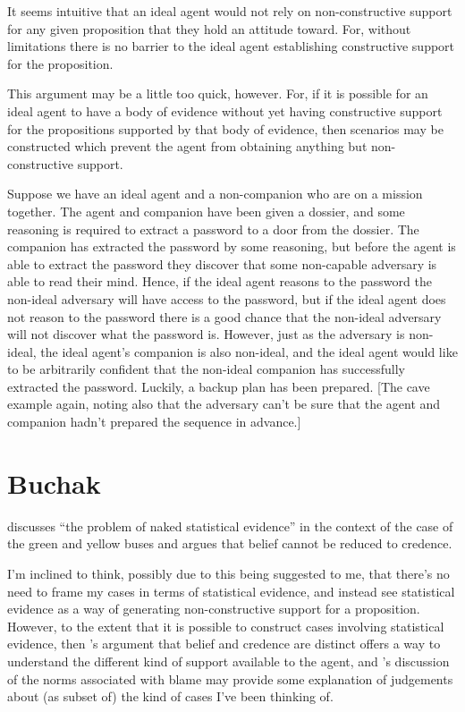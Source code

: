 \documentclass[10pt]{article}
\begin{document}
It seems intuitive that an ideal agent would not rely on non-constructive support for any given proposition that they hold an attitude toward.
For, without limitations there is no barrier to the ideal agent establishing constructive support for the proposition.

This argument may be a little too quick, however.
For, if it is possible for an ideal agent to have a body of evidence without yet having constructive support for the propositions supported by that body of evidence, then scenarios may be constructed which prevent the agent from obtaining anything but non-constructive support.

\begin{scenario}[Secrets]
  Suppose we have an ideal agent and a non-companion who are on a mission together.
  The agent and companion have been given a dossier, and some reasoning is required to extract a password to a door from the dossier.
  The companion has extracted the password by some reasoning, but before the agent is able to extract the password they discover that some non-capable adversary is able to read their mind.
  Hence, if the ideal agent reasons to the password the non-ideal adversary will have access to the password, but if the ideal agent does not reason to the password there is a good chance that the non-ideal adversary will not discover what the password is.
  However, just as the adversary is non-ideal, the ideal agent's companion is also non-ideal, and the ideal agent would like to be arbitrarily confident that the non-ideal companion has successfully extracted the password.
  Luckily, a backup plan has been prepared.
  [The cave example again, noting also that the adversary can't be sure that the agent and companion hadn't prepared the sequence in advance.]
\end{scenario}

\section{Buchak}
\label{sec:buchak}

\textcite{Buchak:2014aa} discusses ``the problem of naked statistical evidence'' in the context of the case of the green and yellow buses and argues that belief cannot be reduced to credence.

I'm inclined to think, possibly due to this being suggested to me, that there's no need to frame my cases in terms of statistical evidence, and instead see statistical evidence as a way of generating non-constructive support for a proposition.
However, to the extent that it is possible to construct cases involving statistical evidence, then \citeauthor{Buchak:2014aa}'s argument that belief and credence are distinct offers a way to understand the different kind of support available to the agent, and \citeauthor{Buchak:2014aa}'s discussion of the norms associated with blame may provide some explanation of judgements about (as subset of) the kind of cases I've been thinking of.
\end{document}
